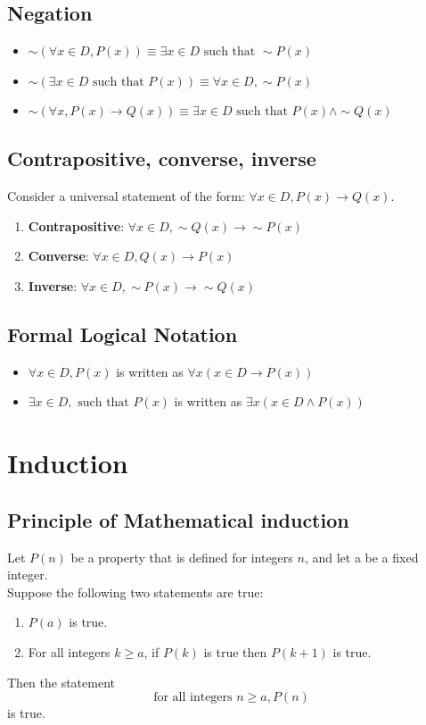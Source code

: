 \documentclass[12pt]{article}
\begin{document}
\subsection{Negation}
\begin{itemize}
\item $\sim(\forall x\in D, P(x))\equiv \exists x\in D \text{ such that }\sim P(x)$
\item $\sim(\exists x\in D \text{ such that }P(x))\equiv \forall x\in D, \sim P(x)$
\item $\sim(\forall x, P(x)\to Q(x))\equiv \exists x\in D\text{ such that } P(x)\land \sim Q(x)$

\end{itemize}
\subsection{Contrapositive, converse, inverse}
Consider a universal statement of the form: $\forall x\in D, P(x)\rightarrow Q(x)$.
\begin{enumerate}
\item \textbf{Contrapositive}: $\forall x\in D, \sim Q(x)\rightarrow \sim P(x)$
\item \textbf{Converse}: $\forall x\in D, Q(x)\rightarrow P(x)$
\item \textbf{Inverse}: $\forall x\in D, \sim P(x)\rightarrow \sim Q(x)$
\end{enumerate}
\subsection{Formal Logical Notation}
\begin{itemize}
\item $\forall x\in D, P(x)$ is written as $\forall x(x\in D\to P(x))$
\item $\exists x\in D,\text{ such that }P(x)$ is written as $\exists x(x\in D\land P(x))$
\end{itemize}
\clearpage
\section{Induction}
\subsection{Principle of Mathematical induction}
Let $P(n)$ be a property that is defined for integers $n$, and let a be a fixed integer.\\
Suppose the following two statements are true:
\begin{enumerate}
\item  $P(a)$ is true.
\item For all integers $k \geq a$, if $P(k)$ is true then $P(k + 1)$ is true.
\end{enumerate}
Then the statement
\[\text{for all integers } n \geq a, P(n)\]
is true.
\end{document}
